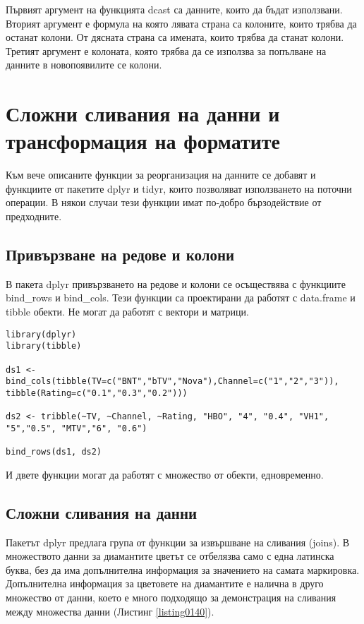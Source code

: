 Първият аргумент на функцията dcast са данните, които да бъдат използвани. Вторият аргумент е формула на която лявата страна са колоните, които трябва да останат колони. От дясната страна са имената, които трябва да станат колони. Третият аргумент е колоната, която трябва да се използва за попълване на данните в новопоявилите се колони. 

\section{Сложни сливания на данни и трансформация на форматите}

Към вече описаните функции за реорганизация на данните се добавят и функциите от пакетите dplyr и tidyr, които позволяват използването на поточни операции. В някои случаи тези функции имат по-добро бързодействие от предходните. 

\subsection{Привързване на редове и колони}

В пакета dplyr привързването на редове и колони се осъществява с функциите bind\_rows и bind\_cols. Тези функции са проектирани да работят с data.frame и tibble обекти. Не могат да работят с вектори и матрици. 

\begin{lstlisting}[caption=Обединяване по колони и редове, label=listing0140]
library(dplyr)
library(tibble)

ds1 <- bind_cols(tibble(TV=c("BNT","bTV","Nova"),Channel=c("1","2","3")), tibble(Rating=c("0.1","0.3","0.2")))

ds2 <- tribble(~TV, ~Channel, ~Rating, "HBO", "4", "0.4", "VH1", "5","0.5", "MTV","6", "0.6")

bind_rows(ds1, ds2)
\end{lstlisting}

И двете функции могат да работят с множество от обекти, едновременно.

\subsection{Сложни сливания на данни}

Пакетът dplyr предлага група от функции за извършване на сливания (joins). В множеството данни за диамантите цветът се отбелязва само с една латинска буква, без да има допълнителна информация за значението на самата маркировка. Допълнителна информация за цветовете на диамантите е налична в друго множество от данни, което е много подходящо за демонстрация на сливания между множества данни (Листинг \ref{listing0140}).

